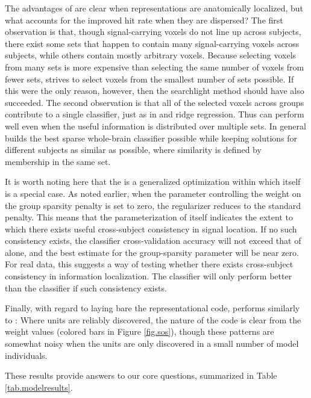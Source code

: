 The advantages of {\soslasso} are clear when representations are anatomically localized, but what accounts for the improved hit rate when they are dispersed? The first observation is that, though signal-carrying voxels do not line up across subjects, there exist some sets that happen to contain many signal-carrying voxels across subjects, while others contain mostly arbitrary voxels. Because selecting voxels from many sets is more expensive than selecting the same number of voxels from fewer sets, {\soslasso} strives to select voxels from the smallest number of sets possible. If this were the only reason, however, then the searchlight method should have also succeeded. The second observation is that all of the selected voxels across groups contribute to a single classifier, just as in {\lasso} and ridge regression. Thus {\soslasso} can perform well even when the useful information is distributed over multiple sets. In general {\soslasso} builds the best sparse whole-brain classifier possible while keeping solutions for different subjects as similar as possible, where similarity is defined by membership in the same set.

It is worth noting here that the {\soslasso} is a generalized optimization within which {\lasso} itself is a special case. As noted earlier, when the parameter controlling the weight on the group sparsity penalty is set to zero, the regularizer reduces to the standard {\lasso} penalty. This means that the parameterization of {\soslasso} itself indicates the extent to which there exists useful cross-subject consistency in signal location. If no such consistency exists, the classifier cross-validation accuracy will not exceed that of {\lasso} alone, and the best estimate for the group-sparsity parameter will be near zero. For real data, this suggests a way of testing whether there exists cross-subject consistency in information localization. The {\soslasso} classifier will only perform better than the {\lasso} classifier if such consistency exists.

Finally, with regard to laying bare the representational code, {\soslasso} performs similarly to {\lasso}: Where units are reliably discovered, the nature of the code is clear from the weight values (colored bars in Figure \ref{fig.sos}), though these patterns are somewhat noisy when the units are only discovered in a small number of model individuals.

These results provide answers to our core questions, summarized in Table \ref{tab.modelresults}.

